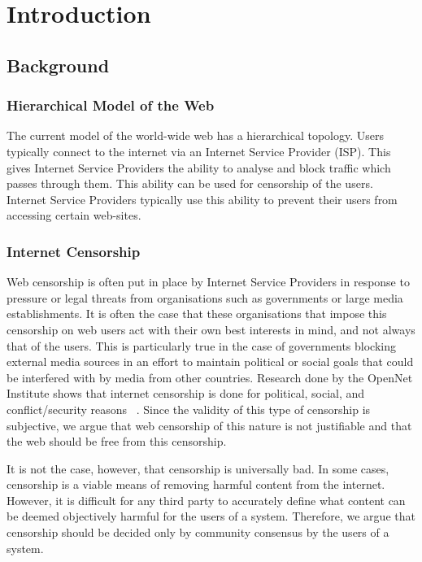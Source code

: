 \chapter{Introduction}

\section{Background}

\subsection{Hierarchical Model of the Web}

The current model of the world-wide web has a hierarchical topology. Users typically
connect to the internet via an Internet Service Provider (ISP).
This gives Internet Service Providers the ability to analyse and block traffic which
passes through them. This ability can be used for censorship of the users.
Internet Service Providers typically use this ability to prevent their users from
accessing certain web-sites.

\subsection{Internet Censorship}

Web censorship is often put in place by Internet Service Providers in response
to pressure or legal threats from organisations such as governments or large media establishments.
It is often the case that these organisations that impose this censorship on web
users act with their own best interests in mind, and not always that of the users. This is
particularly true in the case of governments blocking external media sources in
an effort to maintain political or social goals that could be interfered with
by media from other countries. Research done by the OpenNet Institute
shows that internet censorship is done for political, social, and conflict/security
reasons ~\cite{opennet}. Since the validity of this type of censorship is subjective, we argue that
web censorship of this nature is not justifiable and that the web should be free
from this censorship.

It is not the case, however, that censorship is universally bad. In some cases,
censorship is a viable means of removing harmful content from the internet.
However, it is difficult for any third party to accurately define what content
can be deemed objectively harmful for the users of a system. Therefore, we argue
that censorship should be decided only by community consensus by the users of a system.

